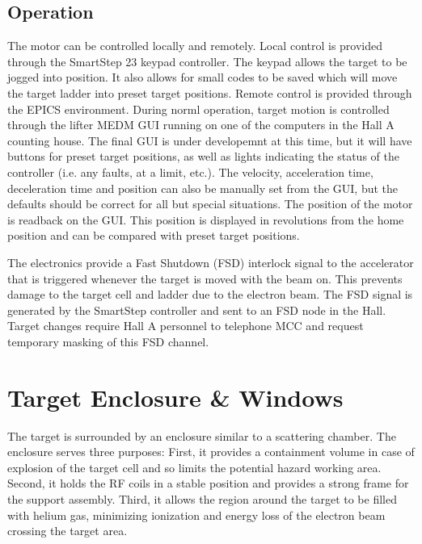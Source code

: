 \subsection{Operation}
        The motor can be controlled locally and remotely.  Local control
is provided through the SmartStep 23 keypad controller.  The keypad 
allows the target to be jogged into position.  It also allows for small
codes to be saved which will move the target ladder into preset target
positions.  Remote control is provided through the EPICS environment.
During norml operation, target motion is controlled through the lifter
MEDM GUI running on one of the computers in the Hall A counting house.
The final GUI is under developemnt at this time, but it will have
buttons for preset target positions, as well as lights
indicating the status of the controller (i.e. any faults, at a limit, etc.).
The velocity, acceleration time, deceleration time and position can
also be manually set from the GUI, but the defaults should be correct
for all but special situations.  The position of the motor is readback
on the GUI.  This position is displayed in revolutions from the home
position and can be compared with preset target positions.  

        The electronics provide a Fast Shutdown (FSD) interlock signal 
to the accelerator that is triggered whenever the target is moved with
the beam on.  This prevents damage to the target
cell and ladder due to the electron beam.  The FSD signal is generated
by the SmartStep controller and sent to an FSD node in the Hall.
Target changes require Hall A personnel to telephone MCC and request
temporary masking of this FSD channel.

\section{Target Enclosure \& Windows}

The target is surrounded by an enclosure similar to a scattering chamber.
The enclosure serves three purposes: First, it provides a
containment volume in case of explosion of the target cell and so limits
the potential hazard working area.  Second, it holds the RF coils in a
stable position and provides a strong frame for the support
assembly. Third, it allows the region around the target to be filled
with helium gas, minimizing ionization and energy loss of the electron 
beam crossing the target area.

